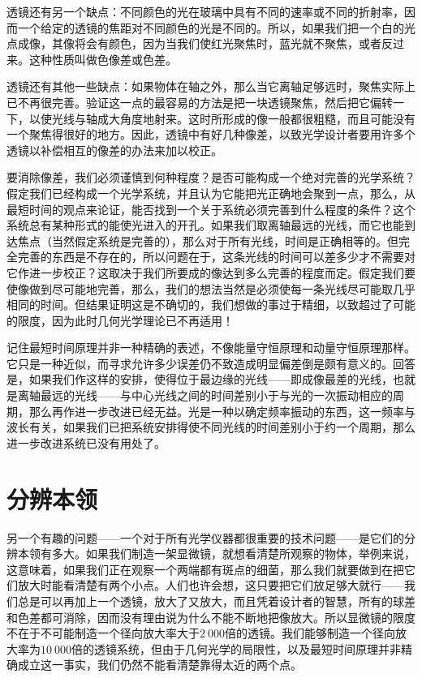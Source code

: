 透镜还有另一个缺点：不同颜色的光在玻璃中具有不同的速率或不同的折射率，因而一个给定的透镜的焦距对不同颜色的光是不同的。所以，如果我们把一个白的光点成像，其像将会有颜色，因为当我们使红光聚焦时，蓝光就不聚焦，或者反过来。这种性质叫做色像差或色差。

透镜还有其他一些缺点：如果物体在轴之外，那么当它离轴足够远时，聚焦实际上已不再很完善。验证这一点的最容易的方法是把一块透镜聚焦，然后把它偏转一下，以使光线与轴成大角度地射来。这时所形成的像一般都很粗糙，而且可能没有一个聚焦得很好的地方。因此，透镜中有好几种像差，以致光学设计者要用许多个透镜以补偿相互的像差的办法来加以校正。

要消除像差，我们必须谨慎到何种程度？是否可能构成一个绝对完善的光学系统？假定我们已经构成一个光学系统，并且认为它能把光正确地会聚到一点，那么，从最短时间的观点来论证，能否找到一个关于系统必须完善到什么程度的条件？这个系统总有某种形式的能使光进入的开孔。如果我们取离轴最远的光线，而它也能到达焦点（当然假定系统是完善的），那么对于所有光线，时间是正确相等的。但完全完善的东西是不存在的，所以问题在于，这条光线的时间可以差多少才不需要对它作进一步校正？这取决于我们所要成的像达到多么完善的程度而定。假定我们要使像做到尽可能地完善，那么，我们的想法当然是必须使每一条光线尽可能取几乎相同的时间。但结果证明这是不确切的，我们想做的事过于精细，以致超过了可能的限度，因为此时几何光学理论已不再适用！

记住最短时间原理并非一种精确的表述，不像能量守恒原理和动量守恒原理那样。它只是一种近似，而寻求允许多少误差仍不致造成明显偏差倒是颇有意义的。回答是，如果我们作这样的安排，使得位于最边缘的光线——即成像最差的光线，也就是离轴最远的光线——与中心光线之间的时间差别小于与光的一次振动相应的周期，那么再作进一步改进已经无益。光是一种以确定频率振动的东西，这一频率与波长有关，如果我们已把系统安排得使不同光线的时间差别小于约一个周期，那么进一步改进系统已没有用处了。

\section{分辨本领}

另一个有趣的问题——一个对于所有光学仪器都很重要的技术问题——是它们的分辨本领有多大。如果我们制造一架显微镜，就想看清楚所观察的物体，举例来说，这意味着，如果我们正在观察一个两端都有斑点的细菌，那么我们就要做到在把它们放大时能看清楚有两个小点。人们也许会想，这只要把它们放足够大就行——我们总是可以再加上一个透镜，放大了又放大，而且凭着设计者的智慧，所有的球差和色差都可消除，因而没有理由说为什么不能不断地把像放大。所以显微镜的限度不在于不可能制造一个径向放大率大于$2~000$倍的透镜。我们能够制造一个径向放大率为$10~000$倍的透镜系统，但由于几何光学的局限性，以及最短时间原理并非精确成立这一事实，我们仍然不能看清楚靠得太近的两个点。

